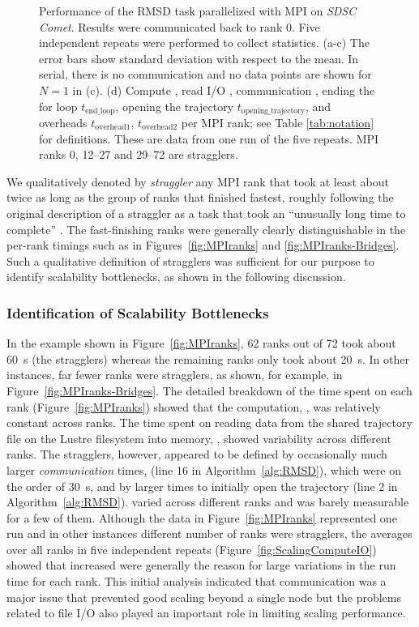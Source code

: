 \begin{figure}[!htb]
  \caption{Performance of the RMSD task parallelized with MPI on \emph{SDSC Comet}.
    Results were communicated back to rank 0.
    Five independent repeats were performed to collect statistics.
    (a-c) The error bars show standard deviation with respect to the mean.
    In serial, there is no communication and no data points are shown for $N=1$ in (c).
    (d) Compute \tcomp, read I/O \tIO, communication \tcomm, ending the for loop $t_{\text{end\_loop}}$, opening the trajectory $t_{\text{opening\_trajectory}}$, and overheads $t_{\text{overhead1}}$, $t_{\text{overhead2}}$ per MPI rank; see Table \ref{tab:notation} for definitions.
    These are data from one run of the five repeats.
    MPI ranks 0, 12--27 and 29--72 are stragglers.
  }
  \label{fig:MPIwithIO}
\end{figure}

We qualitatively denoted by \emph{straggler} any MPI rank that took at least about twice as long as the group of ranks that finished fastest, roughly following the original description of a straggler as a task that took an ``unusually long time to complete'' \cite{Dean2004}.
The fast-finishing ranks were generally clearly distinguishable in the per-rank timings such as in Figures~\ref{fig:MPIranks} and \ref{fig:MPIranks-Bridges}.
Such a qualitative definition of stragglers was sufficient for our purpose to identify scalability bottlenecks, as shown in the following discussion.


\subsubsection*{Identification of Scalability Bottlenecks}

In the example shown in Figure~\ref{fig:MPIranks}, 62 ranks out of 72 took about 60~s (the stragglers) whereas the remaining ranks only took about 20~s.
In other instances, far fewer ranks were stragglers, as shown, for example, in Figure~\ref{fig:MPIranks-Bridges}.
The detailed breakdown of the time spent on each rank (Figure~\ref{fig:MPIranks}) showed that the computation, \tcomp, was relatively constant across ranks. 
The time spent on reading data from the shared trajectory file on the Lustre filesystem into memory, \tIO, showed variability across different ranks. 
The stragglers, however, appeared to be defined by occasionally much larger \emph{communication} times, \tcomm (line 16 in Algorithm~\ref{alg:RMSD}), which were on the order of 30~s, and by larger times to initially open the trajectory (line 2 in Algorithm~\ref{alg:RMSD}).
\tcomm varied across different ranks and was barely measurable for a few of them.
Although the data in Figure~\ref{fig:MPIranks} represented one run and in other instances different number of ranks were stragglers, the averages over all ranks in five independent repeats (Figure~\ref{fig:ScalingComputeIO}) showed that increased \tcomm were generally the reason for large variations in the run time for each rank.
This initial analysis indicated that communication was a major issue that prevented good scaling beyond a single node but the problems related to file I/O also played an important role in limiting scaling performance.



